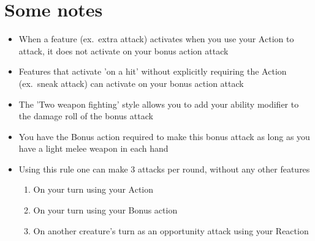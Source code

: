 \documentclass[a4paper]{article}
\begin{document}
\section{Some notes}
\begin{itemize}
\item When a feature (ex.\ extra attack) activates when you use your Action to attack, it does not activate on your bonus action attack
\item Features that activate 'on a hit' without explicitly requiring the Action (ex.\ sneak attack) can activate on your bonus action attack
\item The 'Two weapon fighting' style allows you to add your ability modifier to the damage roll of the bonus attack
\item You have the Bonus action required to make this bonus attack as long as you have a light melee weapon in each hand
\item Using this rule one can make 3 attacks per round, without any other features
	\begin{enumerate}
	\item On your turn using your Action
	\item On your turn using your Bonus action
	\item On another creature's turn as an opportunity attack using your Reaction
	\end{enumerate}
\end{itemize}
\end{document}
